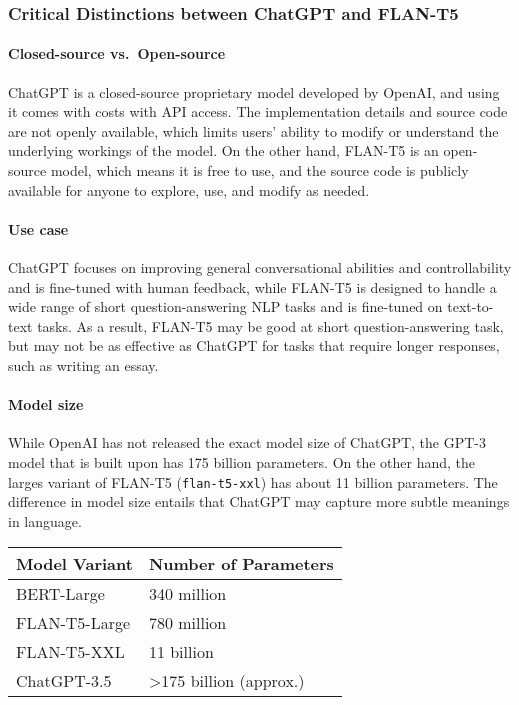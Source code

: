 \documentclass[11pt]{article}
\begin{document}
    \hypertarget{critical-distinctions-between-chatgpt-and-flan-t5}{%
\subsubsection{Critical Distinctions between ChatGPT and
FLAN-T5}\label{critical-distinctions-between-chatgpt-and-flan-t5}}

    \hypertarget{closed-source-vs.-open-source}{%
\paragraph{Closed-source
vs.~Open-source}\label{closed-source-vs.-open-source}}

ChatGPT is a closed-source proprietary model developed by OpenAI, and
using it comes with costs with API access. The implementation details
and source code are not openly available, which limits users' ability to
modify or understand the underlying workings of the model. On the other
hand, FLAN-T5 is an open-source model, which means it is free to use,
and the source code is publicly available for anyone to explore, use,
and modify as needed.

\hypertarget{use-case}{%
\paragraph{Use case}\label{use-case}}

ChatGPT focuses on improving general conversational abilities and
controllability and is fine-tuned with human feedback, while FLAN-T5 is
designed to handle a wide range of short question-answering NLP tasks
and is fine-tuned on text-to-text tasks. As a result, FLAN-T5 may be
good at short question-answering task, but may not be as effective as
ChatGPT for tasks that require longer responses, such as writing an
essay.

\hypertarget{model-size}{%
\paragraph{Model size}\label{model-size}}

While OpenAI has not released the exact model size of ChatGPT, the GPT-3
model that is built upon has 175 billion parameters. On the other hand,
the larges variant of FLAN-T5 (\texttt{flan-t5-xxl}) has about 11
billion parameters. The difference in model size entails that ChatGPT
may capture more subtle meanings in language.

\begin{longtable}[]{@{}ll@{}}
\toprule
Model Variant & Number of Parameters \\
\midrule
\endhead
BERT-Large & 340 million \\
FLAN-T5-Large & 780 million \\
FLAN-T5-XXL & 11 billion \\
ChatGPT-3.5 & \textgreater175 billion (approx.) \\
\bottomrule
\end{longtable}
\end{document}
